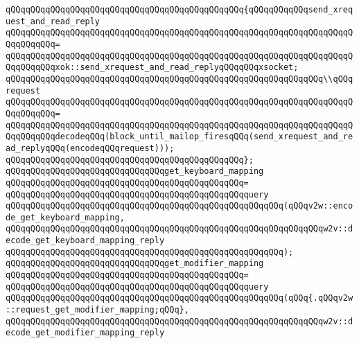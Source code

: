\verb|qQQqqQQqqQQqqQQqqQQqqQQqqQQqqQQqqQQqqQQqqQQqqQQq{qQQqqQQqqQQqsend_xrequest_and_read_reply|\newline
\verb|qQQqqQQqqQQqqQQqqQQqqQQqqQQqqQQqqQQqqQQqqQQqqQQqqQQqqQQqqQQqqQQqqQQqqQQqqQQqqQQq=|\newline
\verb|qQQqqQQqqQQqqQQqqQQqqQQqqQQqqQQqqQQqqQQqqQQqqQQqqQQqqQQqqQQqqQQqqQQqqQQqqQQqqQQqxok::send_xrequest_and_read_replyqQQqqQQqxsocket;|\newline
\newline
\verb|qQQqqQQqqQQqqQQqqQQqqQQqqQQqqQQqqQQqqQQqqQQqqQQqqQQqqQQqqQQqqQQq\\qQQqrequest|\newline
\verb|qQQqqQQqqQQqqQQqqQQqqQQqqQQqqQQqqQQqqQQqqQQqqQQqqQQqqQQqqQQqqQQqqQQqqQQqqQQqqQQq=|\newline
\verb|qQQqqQQqqQQqqQQqqQQqqQQqqQQqqQQqqQQqqQQqqQQqqQQqqQQqqQQqqQQqqQQqqQQqqQQqqQQqqQQqdecodeqQQq(block_until_mailop_firesqQQq(send_xrequest_and_read_replyqQQq(encodeqQQqrequest)));|\newline
\verb|qQQqqQQqqQQqqQQqqQQqqQQqqQQqqQQqqQQqqQQqqQQqqQQq};|\newline
\newline
\verb|qQQqqQQqqQQqqQQqqQQqqQQqqQQqqQQqget_keyboard_mapping|\newline
\verb|qQQqqQQqqQQqqQQqqQQqqQQqqQQqqQQqqQQqqQQqqQQqqQQq=|\newline
\verb|qQQqqQQqqQQqqQQqqQQqqQQqqQQqqQQqqQQqqQQqqQQqqQQqquery|\newline
\verb|qQQqqQQqqQQqqQQqqQQqqQQqqQQqqQQqqQQqqQQqqQQqqQQqqQQqqQQq(qQQqv2w::encode_get_keyboard_mapping,|\newline
\verb|qQQqqQQqqQQqqQQqqQQqqQQqqQQqqQQqqQQqqQQqqQQqqQQqqQQqqQQqqQQqqQQqw2v::decode_get_keyboard_mapping_reply|\newline
\verb|qQQqqQQqqQQqqQQqqQQqqQQqqQQqqQQqqQQqqQQqqQQqqQQqqQQqqQQq);|\newline
\newline
\verb|qQQqqQQqqQQqqQQqqQQqqQQqqQQqqQQqget_modifier_mapping|\newline
\verb|qQQqqQQqqQQqqQQqqQQqqQQqqQQqqQQqqQQqqQQqqQQqqQQq=|\newline
\verb|qQQqqQQqqQQqqQQqqQQqqQQqqQQqqQQqqQQqqQQqqQQqqQQqquery|\newline
\verb|qQQqqQQqqQQqqQQqqQQqqQQqqQQqqQQqqQQqqQQqqQQqqQQqqQQqqQQq(qQQq{.qQQqv2w::request_get_modifier_mapping;qQQq},|\newline
\verb|qQQqqQQqqQQqqQQqqQQqqQQqqQQqqQQqqQQqqQQqqQQqqQQqqQQqqQQqqQQqqQQqw2v::decode_get_modifier_mapping_reply|\newline
